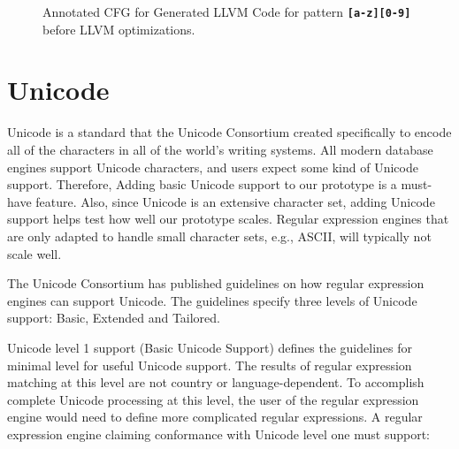 \begin{figure}[H]
    \caption{Annotated CFG for Generated LLVM Code for pattern \texttt{\textbf{[a-z][0-9]}} before LLVM optimizations.}\label{fig:annocfg}
\end{figure}

\section{Unicode}
Unicode is a standard that the Unicode Consortium created specifically to encode all of the characters in all of the world's writing systems. All modern database engines support Unicode characters, and users expect some kind of Unicode support. Therefore, Adding basic Unicode support to our prototype is a must-have feature. Also, since Unicode is an extensive character set, adding Unicode support helps test how well our prototype scales. Regular expression engines that are only adapted to handle small character sets, e.g., ASCII, will typically not scale well.

The Unicode Consortium has published guidelines \cite{unicodeguideline} on how regular expression engines can support Unicode. The guidelines specify three levels of Unicode support: Basic, Extended and Tailored.

Unicode level 1 support (Basic Unicode Support) defines the guidelines for minimal level for useful Unicode support. The results of regular expression matching at this level are not country or language-dependent. To accomplish complete Unicode processing at this level, the user of the regular expression engine would need to define more complicated regular expressions. A regular expression engine claiming conformance with Unicode level one must support:

